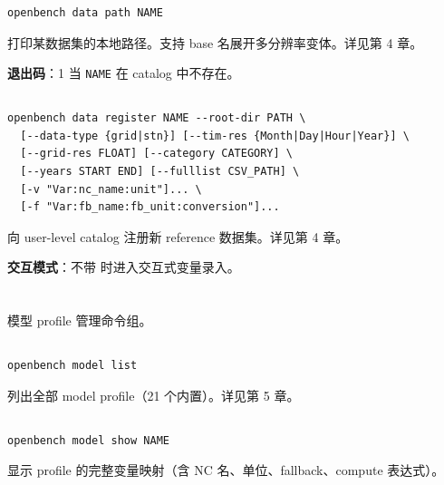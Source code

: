 \begin{verbatim}
openbench data path NAME
\end{verbatim}

打印某数据集的本地路径。支持 base 名展开多分辨率变体。详见第 4 章。

\textbf{退出码}：1 当 \texttt{NAME} 在 catalog 中不存在。

\subsection{}

\begin{verbatim}
openbench data register NAME --root-dir PATH \
  [--data-type {grid|stn}] [--tim-res {Month|Day|Hour|Year}] \
  [--grid-res FLOAT] [--category CATEGORY] \
  [--years START END] [--fulllist CSV_PATH] \
  [-v "Var:nc_name:unit"]... \
  [-f "Var:fb_name:fb_unit:conversion"]...
\end{verbatim}

向 user-level catalog 注册新 reference 数据集。详见第 4 章。

\textbf{交互模式}：不带 \cli{-v} 时进入交互式变量录入。

\section{}

模型 profile 管理命令组。

\subsection{}

\begin{verbatim}
openbench model list
\end{verbatim}

列出全部 model profile（21 个内置）。详见第 5 章。

\subsection{}

\begin{verbatim}
openbench model show NAME
\end{verbatim}

显示 profile 的完整变量映射（含 NC 名、单位、fallback、compute 表达式）。

